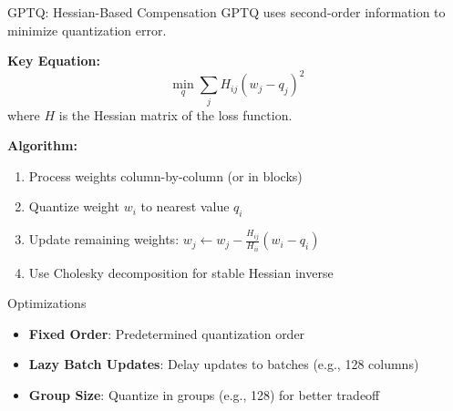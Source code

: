 \documentclass[aspectratio=169,10pt]{beamer}
\begin{document}
\begin{frame}{GPTQ: Hessian-Based Compensation}
    GPTQ uses second-order information to minimize quantization error.

    \vspace{0.3cm}
    \textbf{Key Equation:}
    $$\min_q \sum_j H_{ij}(w_j - q_j)^2$$
    where $H$ is the Hessian matrix of the loss function.

    \vspace{0.1cm}
    \textbf{Algorithm:}
    \begin{enumerate}
        \item Process weights column-by-column (or in blocks)
        \item Quantize weight $w_i$ to nearest value $q_i$
        \item Update remaining weights: $w_j \leftarrow w_j - \frac{H_{ij}}{H_{ii}}(w_i - q_i)$
        \item Use Cholesky decomposition for stable Hessian inverse
    \end{enumerate}

    \vspace{0.1cm}
    \begin{block}{Optimizations}
        \begin{itemize}
            \item \textbf{Fixed Order}: Predetermined quantization order
            \item \textbf{Lazy Batch Updates}: Delay updates to batches (e.g., 128 columns)
            \item \textbf{Group Size}: Quantize in groups (e.g., 128) for better tradeoff
        \end{itemize}
    \end{block}
\end{frame}
\end{document}
